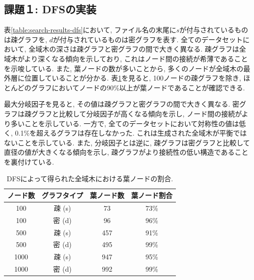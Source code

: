 \documentclass[a4j, 12pt]{jarticle}
\begin{document}
\subsection{課題１: DFSの実装}
表\ref{table:search-results-dfs}において, ファイル名の末尾に$s$が付与されているものは疎グラフを, $d$が付与されているものは密グラフを表す. 全てのデータセットにおいて, 全域木の深さは疎グラフと密グラフの間で大きく異なる. 疎グラフは全域木がより深くなる傾向を示しており, これはノード間の接続が希薄であることを示唆している. また, 葉ノードの数が多いことから, 多くのノードが全域木の最外層に位置していることが分かる. 表\ref{table:leaf-percentage-dfs}を見ると, 100ノードの疎グラフを除き, ほとんどのグラフにおいてノードの90\%以上が葉ノードであることが確認できる.
\begin{table}[H]
  \centering
  \caption{DFSによる各データセットの全域木の特性}\label{table:search-results-dfs}
\end{table}
最大分岐因子を見ると, その値は疎グラフと密グラフの間で大きく異なる. 密グラフは疎グラフと比較して分岐因子が高くなる傾向を示し, ノード間の接続がより多いことを示している. 一方で, 全てのデータセットにおいて対称性の値は低く, 0.1\%を超えるグラフは存在しなかった. これは生成された全域木が平衡ではないことを示している. また, 分岐因子とは逆に, 疎グラフは密グラフと比較して直径の値が大きくなる傾向を示し, 疎グラフがより接続性の低い構造であることを裏付けている.
\begin{table}[h]
  \centering
  \caption{DFSによって得られた全域木における葉ノードの割合.}\label{table:leaf-percentage-dfs}
  \begin{tabular}{cccc}
  \hline
  ノード数 & グラフタイプ & 葉ノード数 & 葉ノード割合 \\
  \hline
  100   & 疎 (s)   & 73   & 73\%  \\
  100   & 密 (d)   & 96   & 96\%  \\
  500   & 疎 (s)   & 457  & 91\%  \\
  500   & 密 (d)   & 495  & 99\%  \\
  1000  & 疎 (s)   & 947  & 95\%  \\
  1000  & 密 (d)   & 992  & 99\%  \\
  \hline
  \end{tabular}
\end{table}
\end{document}
